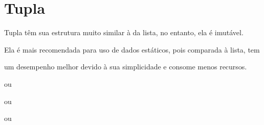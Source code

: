 \documentclass[letterpaper,10pt,brazil]{sphinxmanual}
\begin{document}
\chapter{Tupla}
\label{\detokenize{content/tuple:tupla}}\label{\detokenize{content/tuple::doc}}
\begin{DUlineblock}{0em}
\item[]
\begin{DUlineblock}{\DUlineblockindent}
\item[] Tupla têm sua estrutura muito similar à da lista, no entanto, ela é imutável.
\item[] Ela é mais recomendada para uso de dados estáticos, pois comparada à lista, tem
\end{DUlineblock}
\item[] um desempenho melhor devido à sua simplicidade e consome menos recursos.
\end{DUlineblock}

\begin{sphinxVerbatim}[commandchars=\\\{\}]
      
\end{sphinxVerbatim}

ou

\begin{sphinxVerbatim}[commandchars=\\\{\}]
  
\end{sphinxVerbatim}

\begin{sphinxVerbatim}[commandchars=\\\{\}]
      \PYG{p}{[}  \PYG{p}{]}
\end{sphinxVerbatim}

ou

\begin{sphinxVerbatim}[commandchars=\\\{\}]
    
\end{sphinxVerbatim}

ou

\begin{sphinxVerbatim}[commandchars=\\\{\}]
    
\end{sphinxVerbatim}
\end{document}
